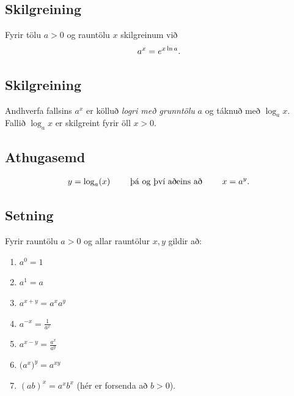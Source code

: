 \documentclass[a4paper,10pt,icelandic]{sphinxmanual}
\begin{document}
\subsection{Skilgreining}
\label{kafli04:skilgreining}\label{kafli04:index-3}
Fyrir tölu \(a>0\) og rauntölu \(x\) skilgreinum við
\begin{gather}
\begin{split}a^x=e^{x\ln a}.\end{split}\notag
\end{gather}

\subsection{Skilgreining}
\label{kafli04:id3}\label{kafli04:index-4}
Andhverfa fallsins \(a^x\) er kölluð \emph{logri með grunntölu} \(a\)
og táknuð með \(\log_a x\). Fallið \(\log_a x\) er skilgreint
fyrir öll \(x>0\).


\subsection{Athugasemd}
\label{kafli04:athugasemd}\begin{gather}
\begin{split}y =\log_a(x)\qquad \text{ þá og því aðeins að } \qquad x = a^y.\end{split}\notag
\end{gather}

\subsection{Setning}
\label{kafli04:id4}
Fyrir rauntölu \(a>0\) og allar rauntölur \(x,y\) gildir að:
\begin{enumerate}
\item {} 
\(a^0=1\)

\item {} 
\(a^1=a\)

\item {} 
\(a^{x+y}=a^xa^y\)

\item {} 
\(a^{-x}=\frac{1}{a^x}\)

\item {} 
\(a^{x-y}=\frac{a^x}{a^y}\)

\item {} 
\(\big(a^x\big)^y=a^{xy}\)

\item {} 
\((ab)^x=a^xb^x\) (hér er forsenda að \(b>0\)).

\end{enumerate}
\end{document}
